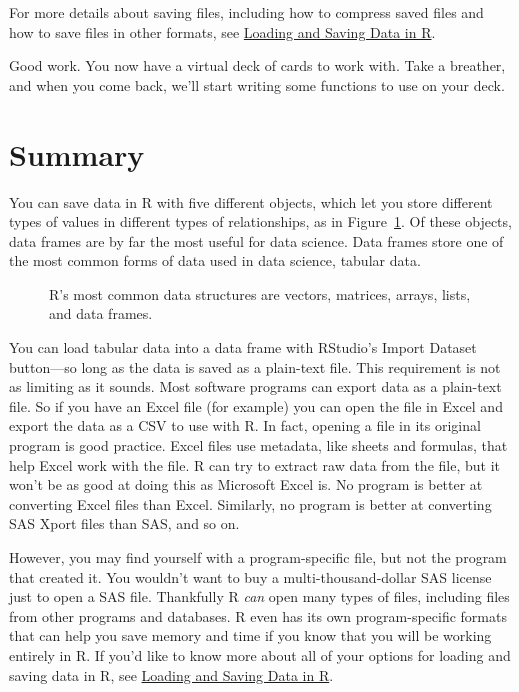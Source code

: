 \documentclass[
  letterpaper,
  DIV=11,
  numbers=noendperiod]{scrbook}
\makeatletter
\newcommand*\pandocbounded[1]{%
  \sbox\pandoc@box{#1}%
  \Gscale@div\@tempa{\textheight}{\dimexpr\ht\pandoc@box+\dp\pandoc@box\relax}%
  \Gscale@div\@tempb{\linewidth}{\wd\pandoc@box}%
  \ifdim\@tempb\p@<\@tempa\p@\let\@tempa\@tempb\fi%
  \ifdim\@tempa\p@<\p@\scalebox{\@tempa}{\usebox\pandoc@box}%
  \else\usebox{\pandoc@box}%
  \fi%
}
\makeatother
\begin{document}
For more details about saving files, including how to compress saved
files and how to save files in other formats, see
\hyperref[sec-appendix-dataio]{Loading and Saving Data in R}.

Good work. You now have a virtual deck of cards to work with. Take a
breather, and when you come back, we'll start writing some functions to
use on your deck.

\section{Summary}\label{summary-2}

You can save data in R with five different objects, which let you store
different types of values in different types of relationships, as in
Figure~\ref{fig-structures}. Of these objects, data frames are by far
the most useful for data science. Data frames store one of the most
common forms of data used in data science, tabular data.

\begin{figure}

\centering{

\pandocbounded{\texttt{[image: images/hopr\_0306.png]}}

}

\caption{\label{fig-structures}R's most common data structures are
vectors, matrices, arrays, lists, and data frames.}

\end{figure}%

You can load tabular data into a data frame with RStudio's Import
Dataset button---so long as the data is saved as a plain-text file. This
requirement is not as limiting as it sounds. Most software programs can
export data as a plain-text file. So if you have an Excel file (for
example) you can open the file in Excel and export the data as a CSV to
use with R. In fact, opening a file in its original program is good
practice. Excel files use metadata, like sheets and formulas, that help
Excel work with the file. R can try to extract raw data from the file,
but it won't be as good at doing this as Microsoft Excel is. No program
is better at converting Excel files than Excel. Similarly, no program is
better at converting SAS Xport files than SAS, and so on.

However, you may find yourself with a program-specific file, but not the
program that created it. You wouldn't want to buy a
multi-thousand-dollar SAS license just to open a SAS file. Thankfully R
\emph{can} open many types of files, including files from other programs
and databases. R even has its own program-specific formats that can help
you save memory and time if you know that you will be working entirely
in R. If you'd like to know more about all of your options for loading
and saving data in R, see \hyperref[sec-appendix-dataio]{Loading and
Saving Data in R}.
\end{document}

